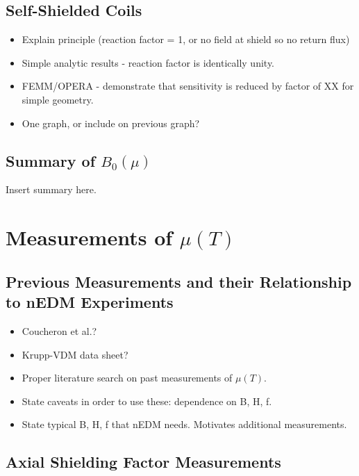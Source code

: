 \documentclass[review]{elsarticle}
\begin{document}
\subsection{Self-Shielded Coils}

\begin{itemize}
\item Explain principle (reaction factor = 1, or no field at shield so
  no return flux)
\item Simple analytic results - reaction factor is identically unity.
\item FEMM/OPERA - demonstrate that sensitivity is reduced by factor
  of XX for simple geometry.
\item One graph, or include on previous graph?
\end{itemize}

\subsection{Summary of $B_0(\mu)$}

Insert summary here.

\section{Measurements of $\mu(T)$}

\subsection{Previous Measurements and their Relationship to nEDM Experiments}

\begin{itemize}
\item Coucheron et al.?
\item Krupp-VDM data sheet?
\item Proper literature search on past measurements of $\mu(T)$.
\item State caveats in order to use these:  dependence on B, H, f.
\item State typical B, H, f that nEDM needs.  Motivates additional
  measurements.
\end{itemize}

\subsection{Axial Shielding Factor Measurements}
\end{document}
